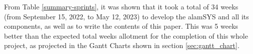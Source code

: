 From Table \ref{summary-sprints}, it was
shown that it took a total of 34 weeks (from September 15, 2022, 
to May 12, 2023) to develop the alamSYS and all its components, as
well as to write the contents of this paper. This was 5 weeks
better than the expected total weeks allotment for the completion
of this whole project, as projected in the Gantt Charts shown in
section \ref{sec:gantt_chart}.